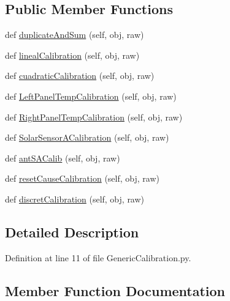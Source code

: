 \subsection*{Public Member Functions}
\begin{DoxyCompactItemize}
\item 
def \hyperlink{class_calibration_1_1_generic_calibration_1_1_g_calibration_aa8a8e1075119495d19d04a671d1e3278}{duplicate\+And\+Sum} (self, obj, raw)
\item 
def \hyperlink{class_calibration_1_1_generic_calibration_1_1_g_calibration_ae25fe6ab593f55c9e3bff1194fbf7995}{lineal\+Calibration} (self, obj, raw)
\item 
def \hyperlink{class_calibration_1_1_generic_calibration_1_1_g_calibration_aa11ebe9199aca09c42dcab5d30d5e78f}{cuadratic\+Calibration} (self, obj, raw)
\item 
def \hyperlink{class_calibration_1_1_generic_calibration_1_1_g_calibration_ae670764ecf437f732d6ba37a58d1b361}{Left\+Panel\+Temp\+Calibration} (self, obj, raw)
\item 
def \hyperlink{class_calibration_1_1_generic_calibration_1_1_g_calibration_add4cb115617aa6184b14a54bca17f6d9}{Right\+Panel\+Temp\+Calibration} (self, obj, raw)
\item 
def \hyperlink{class_calibration_1_1_generic_calibration_1_1_g_calibration_aad7eaea2ff626f9ac449c5b10f629bfd}{Solar\+Sensor\+A\+Calibration} (self, obj, raw)
\item 
def \hyperlink{class_calibration_1_1_generic_calibration_1_1_g_calibration_aa90df6bb4c4ba12f9ab0f1fb39d8123e}{ant\+S\+A\+Calib} (self, obj, raw)
\item 
def \hyperlink{class_calibration_1_1_generic_calibration_1_1_g_calibration_afde334bb66bac7e333dd2152cc74629b}{reset\+Cause\+Calibration} (self, obj, raw)
\item 
def \hyperlink{class_calibration_1_1_generic_calibration_1_1_g_calibration_a61fe1bfb29d895c6a479bd753b36ff86}{discret\+Calibration} (self, obj, raw)
\end{DoxyCompactItemize}


\subsection{Detailed Description}


Definition at line 11 of file Generic\+Calibration.\+py.



\subsection{Member Function Documentation}
\hypertarget{class_calibration_1_1_generic_calibration_1_1_g_calibration_aa90df6bb4c4ba12f9ab0f1fb39d8123e}{}
